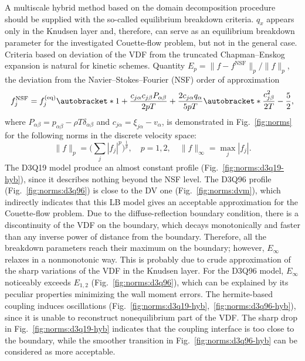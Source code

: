 \documentclass[]{elsarticle} %
\DeclarePairedDelimiter\autobracket()       %
\newcommand{\br}[1]{\autobracket*{#1}}
\newcommand{\xiai}{\xi_{j \alpha}}
\newcommand{\cai}{c_{j \alpha}}
\newcommand{\caj}{c_{j \beta}}
\newcommand{\equil}[1]{#1^\mathrm{(eq)}}
\begin{document}
A multiscale hybrid method based on the domain decomposition procedure should be supplied with the so-called equilibrium breakdown criteria.
\(q_x\) appears only in the Knudsen layer and, therefore, can serve as an equilibrium breakdown parameter
for the investigated Couette-flow problem, but not in the general case.
Criteria based on deviation of the VDF from the truncated Chapman--Enskog expansion is natural for kinetic schemes.
Quantity \(E_p=\|f-f^{\mathrm{NSF}}\|_p/\|f\|_p\), the deviation from the Navier--Stokes--Fourier (NSF) order of approximation~\cite{Zhang2014}
\begin{equation}\label{eq:NSF}
    f^{\mathrm{NSF}}_j = \equil{f}_j\br{
        1 + \frac{\cai\caj P_{\alpha\beta}}{2pT} + \frac{2\cai q_\alpha}{5pT}\br{\frac{\caj^2}{2T} - \frac52} },
\end{equation}
where \(P_{\alpha\beta} = p_{\alpha\beta} - \rho T\delta_{\alpha\beta}\) and \(\cai = \xiai - v_\alpha\),
is demonstrated in Fig.~\ref{fig:norms} for the following norms in the discrete velocity space:
\begin{equation}\label{eq:norms}
    \|f\|_p = \bigg(\sum_j |f_j|^p \bigg)^\frac1p, \quad p=1,2, \quad \|f\|_\infty = \max_j |f_j|.
\end{equation}
The D3Q19 model produce an almost constant profile (Fig.~\ref{fig:norms:d3q19-hyb}),
since it describes nothing beyond the NSF level.
The D3Q96 profile (Fig.~\ref{fig:norms:d3q96}) is close to the DV one (Fig.~\ref{fig:norms:dvm}),
which indirectly indicates that this LB model gives an acceptable approximation for the Couette-flow problem.
Due to the diffuse-reflection boundary condition, there is a discontinuity of the VDF on the boundary,
which decays monotonically and faster than any inverse power of distance from the boundary.
Therefore, all the breakdown parameters reach their maximum on the boundary;
however, \(E_\infty\) relaxes in a nonmonotonic way.
This is probably due to crude approximation of the sharp variations of the VDF in the Knudsen layer.
For the D3Q96 model, \(E_\infty\) noticeably exceeds \(E_{1,2}\) (Fig.~\ref{fig:norms:d3q96}),
which can be explained by its peculiar properties minimizing the wall moment errors.
The hermite-based coupling induces oscillations (Fig.~\ref{fig:norms:d3q19-hyb},~\ref{fig:norms:d3q96-hyb}),
since it is unable to reconstruct nonequilibrium part of the VDF.
The sharp drop in Fig.~\ref{fig:norms:d3q19-hyb} indicates that the coupling interface is too close to the boundary,
while the smoother transition in Fig.~\ref{fig:norms:d3q96-hyb} can be considered as more acceptable.
\end{document}
